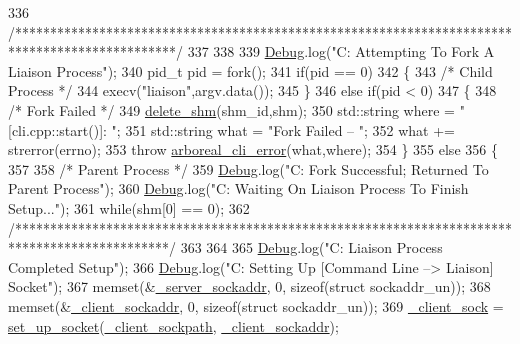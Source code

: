 \begin{DoxyCode}
336   \textcolor{comment}{/***********************************************************************************************/}
337 
338 
339   \mbox{\hyperlink{_cli_8h_ab6d95a4e6a59b4ad033ed3af31d878e0}{Debug}}.log(\textcolor{stringliteral}{"C: Attempting To Fork A Liaison Process"});
340   pid\_t pid = fork();
341   \textcolor{keywordflow}{if}(pid == 0)
342   \{
343     \textcolor{comment}{/* Child Process */}
344     execv(\textcolor{stringliteral}{"liaison"},argv.data());
345   \}
346   \textcolor{keywordflow}{else} \textcolor{keywordflow}{if}(pid < 0)
347   \{
348     \textcolor{comment}{/* Fork Failed */}
349     \mbox{\hyperlink{cli__helper_8hpp_a29ecb490f9644dd283298edaaa0b2130}{delete\_shm}}(shm\_id,shm);
350     std::string where = \textcolor{stringliteral}{"[cli.cpp::start()]: "};
351     std::string what = \textcolor{stringliteral}{"Fork Failed -- "};
352     what += strerror(errno);
353     \textcolor{keywordflow}{throw} \mbox{\hyperlink{classarboreal__cli__error}{arboreal\_cli\_error}}(what,where);
354   \}
355   \textcolor{keywordflow}{else}
356   \{
357 
358     \textcolor{comment}{/* Parent Process */}
359     \mbox{\hyperlink{_cli_8h_ab6d95a4e6a59b4ad033ed3af31d878e0}{Debug}}.log(\textcolor{stringliteral}{"C: Fork Successful; Returned To Parent Process"});
360     \mbox{\hyperlink{_cli_8h_ab6d95a4e6a59b4ad033ed3af31d878e0}{Debug}}.log(\textcolor{stringliteral}{"C: Waiting On Liaison Process To Finish Setup..."});
361     \textcolor{keywordflow}{while}(shm[0] == 0);
362     \textcolor{comment}{/**********************************************************************************************/}
363 
364 
365     \mbox{\hyperlink{_cli_8h_ab6d95a4e6a59b4ad033ed3af31d878e0}{Debug}}.log(\textcolor{stringliteral}{"C: Liaison Process Completed Setup"});
366     \mbox{\hyperlink{_cli_8h_ab6d95a4e6a59b4ad033ed3af31d878e0}{Debug}}.log(\textcolor{stringliteral}{"C: Setting Up [Command Line --> Liaison] Socket"});
367     memset(&\mbox{\hyperlink{class_c_l_i_a8100e64420f5528d1a09a18433ae24f9}{\_server\_sockaddr}}, 0, \textcolor{keyword}{sizeof}(\textcolor{keyword}{struct} sockaddr\_un));
368     memset(&\mbox{\hyperlink{class_c_l_i_a8c449fcba5105eec8d582c4695bfaca9}{\_client\_sockaddr}}, 0, \textcolor{keyword}{sizeof}(\textcolor{keyword}{struct} sockaddr\_un));
369     \mbox{\hyperlink{class_c_l_i_a89c215687bff66a3e0359a17bac3657d}{\_client\_sock}} = \mbox{\hyperlink{cli__helper_8hpp_ac8ce69e525016b90209b0d970c9e7d2c}{set\_up\_socket}}(\mbox{\hyperlink{class_c_l_i_ad3b7579608f8c2e1d4c01a8668f701d9}{\_client\_sockpath}},
      \mbox{\hyperlink{class_c_l_i_a8c449fcba5105eec8d582c4695bfaca9}{\_client\_sockaddr}});

\end{DoxyCode}
